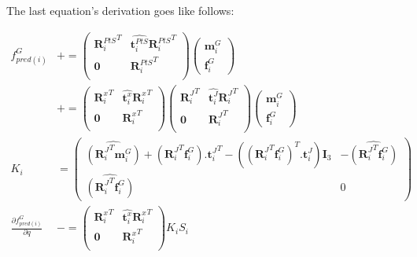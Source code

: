 The last equation's derivation goes like follows:

\begin{align}
  f^G_{pred(i)} & +=
  \begin{pmatrix}
    {\mathbf{R}^{PtS}_i}^T & \widehat{\mathbf{t}^{PtS}_i}{\mathbf{R}^{PtS}_i}^T \\
    \mathbf{0} & {\mathbf{R}^{PtS}_i}^T \\
  \end{pmatrix}
  \begin{pmatrix}
    \mathbf{m}^{G}_i \\ \mathbf{f}^{G}_i
  \end{pmatrix}
  \\
  & += \begin{pmatrix}
    {\mathbf{R}^{x}_i}^T & \widehat{\mathbf{t}^{x}_i}{\mathbf{R}^{x}_i}^T \\
    \mathbf{0} & {\mathbf{R}^{x}_i}^T \\
  \end{pmatrix}
  \begin{pmatrix}
    {\mathbf{R}^{J}_i}^T & \widehat{\mathbf{t}^{J}_i}{\mathbf{R}^{J}_i}^T \\
    \mathbf{0} & {\mathbf{R}^{J}_i}^T \\
  \end{pmatrix}
  \begin{pmatrix}
    \mathbf{m}^{G}_i \\ \mathbf{f}^{G}_i
  \end{pmatrix}
  \\
  K_i &=
  \begin{pmatrix}
    \widehat{({\mathbf{R}_i^J}^T \mathbf{m}^{G}_i)}
    + \left({\mathbf{R}_i^J}^T \mathbf{f}^{G}_i\right) . {\mathbf{t}^J_i}^T
    - \left( ({\mathbf{R}_i^J}^T \mathbf{f}^{G}_i)^T . \mathbf{t}^J_i\right) \mathbf{I}_3
    & -\widehat{({\mathbf{R}_i^J}^T \mathbf{f}^{G}_i)} \\
    \widehat{({\mathbf{R}_i^J}^T \mathbf{f}^{G}_i)} & 0
  \end{pmatrix}
  \\
  \frac{\partial f^G_{pred(i)}}{\partial q} & -=
  \begin{pmatrix}
    {\mathbf{R}^{x}_i}^T & \widehat{\mathbf{t}^{x}_i}{\mathbf{R}^{x}_i}^T \\
    \mathbf{0} & {\mathbf{R}^{x}_i}^T \\
  \end{pmatrix}
  K_i S_i
\end{align}


